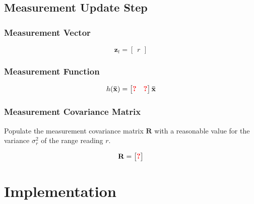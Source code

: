 \documentclass{article}
\newcommand{\todo}[1]{\textcolor{red}{\textbf{#1}}}
\begin{document}
\subsection{Measurement Update Step}

\subsubsection{Measurement Vector}

\begin{equation}
  \mathbf{z}_t = \begin{bmatrix}
  r
  \end{bmatrix}
\end{equation}

\subsubsection{Measurement Function}

\begin{equation}
  h(\mathbf{\bar x}) = \begin{bmatrix}
  \todo{?} & \todo{?}
  \end{bmatrix}\mathbf{\bar x}
\end{equation}

\subsubsection{Measurement Covariance Matrix}

Populate the measurement covariance matrix $\mathbf{R}$ with a reasonable value for the variance $\sigma^2_r$ of the range reading $r$.

\begin{equation}
  \mathbf{R} = \begin{bmatrix}
  \todo{?}
  \end{bmatrix}
\end{equation}

\section{Implementation}
\end{document}
